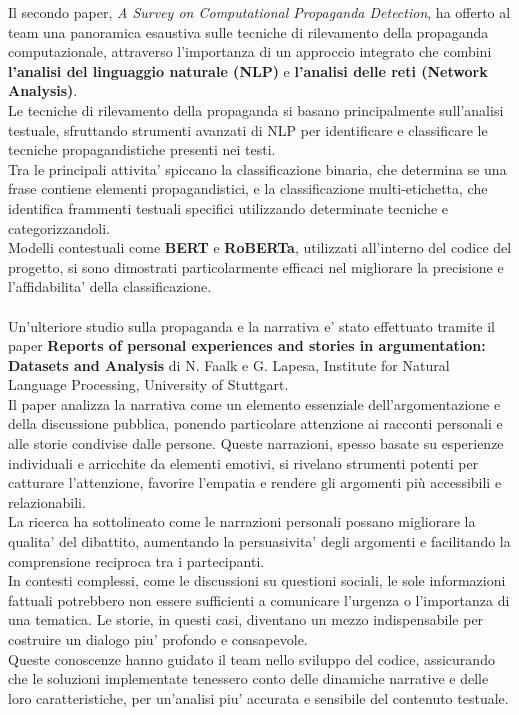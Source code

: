 \documentclass{article}
\begin{document}
Il secondo paper, \textit{A Survey on Computational Propaganda Detection}, ha offerto al team una panoramica  esaustiva sulle tecniche di rilevamento della propaganda computazionale, attraverso l'importanza di un approccio integrato che combini \textbf{l'analisi del linguaggio naturale (NLP)} e \textbf{l'analisi delle reti (Network Analysis)}.\\
Le tecniche di rilevamento della propaganda si basano principalmente sull'analisi testuale, sfruttando strumenti avanzati di NLP per identificare e classificare le tecniche propagandistiche presenti nei testi.\\ Tra le principali attivita' spiccano la classificazione binaria, che determina se una frase contiene elementi propagandistici, e la classificazione multi-etichetta, che identifica frammenti testuali specifici utilizzando determinate tecniche e categorizzandoli. \\ Modelli contestuali come \textbf{BERT} e \textbf{RoBERTa}, utilizzati all'interno del codice del progetto, si sono dimostrati particolarmente efficaci nel migliorare la precisione e l'affidabilita' della classificazione.\\
\\
Un'ulteriore studio sulla propaganda e la narrativa e' stato effettuato tramite il paper \textbf{Reports of personal experiences and stories in argumentation: Datasets and Analysis} di N. Faalk e G. Lapesa, Institute for Natural Language Processing, University of Stuttgart.\\
Il paper analizza la narrativa come un elemento essenziale dell'argomentazione e della discussione pubblica, ponendo particolare attenzione ai racconti personali e alle storie condivise dalle persone. Queste narrazioni, spesso basate su esperienze individuali e arricchite da elementi emotivi, si rivelano strumenti potenti per catturare l'attenzione, favorire l'empatia e rendere gli argomenti più accessibili e relazionabili.\\


La ricerca ha sottolineato come le narrazioni personali possano migliorare la qualita' del dibattito, aumentando la persuasivita' degli argomenti e facilitando la comprensione reciproca tra i partecipanti.\\ In contesti complessi, come le discussioni su questioni sociali, le sole informazioni fattuali potrebbero non essere sufficienti a comunicare l'urgenza o l'importanza di una tematica. Le storie, in questi casi, diventano un mezzo indispensabile per costruire un dialogo piu' profondo e consapevole.\\ 
Queste conoscenze hanno guidato il team nello sviluppo del codice, assicurando che le soluzioni implementate tenessero conto delle dinamiche narrative e delle loro caratteristiche, per un'analisi piu' accurata e sensibile del contenuto testuale.
\end{document}
